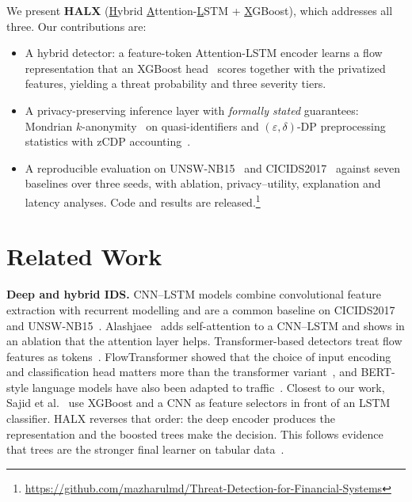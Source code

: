 We present \textbf{HALX} (\underline{H}ybrid
\underline{A}ttention-\underline{L}STM + \underline{X}GBoost), which
addresses all three. Our contributions are:
\begin{itemize}
  \item A hybrid detector: a feature-token Attention-LSTM encoder learns a
        flow representation that an XGBoost head~\cite{chen2016xgboost}
        scores together with the privatized features, yielding a threat
        probability and three severity tiers.
  \item A privacy-preserving inference layer with \emph{formally stated}
        guarantees: Mondrian $k$-anonymity~\cite{lefevre2006mondrian} on
        quasi-identifiers and $(\varepsilon,\delta)$-DP preprocessing
        statistics with zCDP accounting~\cite{bun2016zcdp}.
  \item A reproducible evaluation on UNSW-NB15~\cite{moustafa2015unsw} and
        CICIDS2017~\cite{sharafaldin2018cicids} against seven baselines over
        three seeds, with ablation, privacy--utility, explanation and
        latency analyses. Code and results are released.\footnote{\url{https://github.com/mazharulmd/Threat-Detection-for-Financial-Systems}}
\end{itemize}

\section{Related Work}
\label{sec:related}
\textbf{Deep and hybrid IDS.} CNN--LSTM models combine convolutional
feature extraction with recurrent modelling and are a common baseline on
CICIDS2017 and UNSW-NB15~\cite{halbouni2022cnnlstm,altunay2023cnnlstm}.
Alashjaee~\cite{alashjaee2025attn} adds self-attention to a CNN--LSTM and
shows in an ablation that the attention layer helps.
Transformer-based detectors treat flow features as
tokens~\cite{wu2022rtids,long2024cloud,akuthota2025iot}. FlowTransformer
showed that the choice of input encoding and classification head matters more
than the transformer variant~\cite{manocchio2024flowtransformer}, and
BERT-style language models have also been adapted to
traffic~\cite{yang2025bert}. Closest to our work, Sajid et
al.~\cite{sajid2024hybrid} use XGBoost and a CNN as feature selectors in
front of an LSTM classifier. HALX reverses that order: the deep encoder
produces the representation and the boosted trees make the decision. This
follows evidence that trees are the stronger final learner on tabular
data~\cite{grinsztajn2022tree,gorishniy2021revisiting}.

